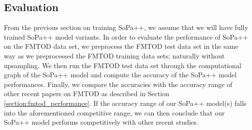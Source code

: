 \subsection{Evaluation}

From the previous section on training SoPa++, we assume that we will have fully
trained SoPa++ model variants. In order to evaluate the performance of SoPa++ on
the FMTOD data set, we preprocess the FMTOD test data set in the same way as we
preprocessed the FMTOD training data sets; naturally without upsampling. We then
run the FMTOD test data set through the computational graph of the SoPa++ model
and compute the accuracy of the SoPa++ model performances. Finally, we compare
the accuracies with the accuracy range of other recent papers on FMTOD as
described in Section \ref{section:fmtod_performance}. If the accuracy range of
our SoPa++ model(s) falls into the aforementioned competitive range, we can then
conclude that our SoPa++ model performs competitively with other recent studies.


